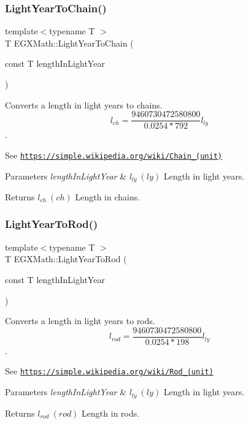 \subsubsection{\texorpdfstring{Light\+Year\+To\+Chain()}{LightYearToChain()}}
{\footnotesize\ttfamily template$<$typename T $>$ \\
T E\+G\+X\+Math\+::\+Light\+Year\+To\+Chain (\begin{DoxyParamCaption}\item[{const T}]{length\+In\+Light\+Year }\end{DoxyParamCaption})}



Converts a length in light years to chains. \[ l_{ch}= \frac{9460730472580800}{0.0254 * 792} l_{ly} \]. 

See \href{https://simple.wikipedia.org/wiki/Chain_(unit)}{\tt https\+://simple.\+wikipedia.\+org/wiki/\+Chain\+\_\+(unit)} 
\begin{DoxyParams}{Parameters}
{\em length\+In\+Light\+Year} & $ l_{ly}\ (ly)$ Length in light years. \\
\hline
\end{DoxyParams}
\begin{DoxyReturn}{Returns}
$ l_{ch}\ (ch)$ Length in chains. 
\end{DoxyReturn}
\mbox{\label{group___e_g_x_math-_conversions-_length_conversions-_astronomical-_light_year-_surveyors_ga8cb7f2e1dbbe56d0d87ce11015d4fdb6}} 
\subsubsection{\texorpdfstring{Light\+Year\+To\+Rod()}{LightYearToRod()}}
{\footnotesize\ttfamily template$<$typename T $>$ \\
T E\+G\+X\+Math\+::\+Light\+Year\+To\+Rod (\begin{DoxyParamCaption}\item[{const T}]{length\+In\+Light\+Year }\end{DoxyParamCaption})}



Converts a length in light years to rods. \[ l_{rod}= \frac{9460730472580800}{0.0254 * 198} l_{ly} \]. 

See \href{https://simple.wikipedia.org/wiki/Rod_(unit)}{\tt https\+://simple.\+wikipedia.\+org/wiki/\+Rod\+\_\+(unit)} 
\begin{DoxyParams}{Parameters}
{\em length\+In\+Light\+Year} & $ l_{ly}\ (ly)$ Length in light years. \\
\hline
\end{DoxyParams}
\begin{DoxyReturn}{Returns}
$ l_{rod}\ (rod)$ Length in rods. 
\end{DoxyReturn}
